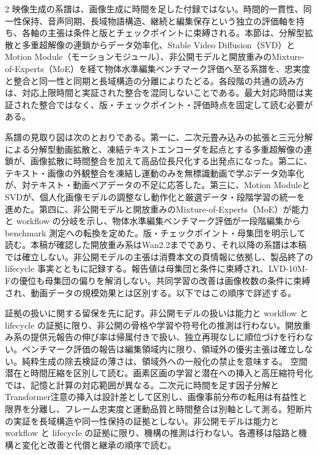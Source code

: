 \documentclass[lualatex,a4paper,10pt]{jlreq}
\begin{document}
\begin{multicols}{2}
\raggedcolumns
映像生成の系譜は、画像生成に時間を足した付録ではない。時間的一貫性、同一性保持、音声同期、長域物語構造、継続と編集保存という独立の評価軸を持ち、各軸の主張は条件と版とチェックポイントに束縛される\autocite{btd070,btd071}。本節は、分解型拡散と多重超解像の連鎖からデータ効率化、Stable Video Diffusion（SVD）とMotion Module（モーションモジュール）、非公開モデルと開放重みのMixture-of-Experts（MoE）を経て物体水準編集ベンチマーク評価へ至る系譜を、忠実度と整合と同一性と同期と長域構造の分離によりたどる\autocite{btd070,btd071,btd073}。各段階の共通の読み方は、対応上限時間と実証された整合を混同しないことである。最大対応時間は実証された整合ではなく、版・チェックポイント・評価時点を固定して読む必要がある\autocite{btd070,btd071,btd073,btd074,btd075,btd077,btd124}。

系譜の見取り図は次のとおりである。第一に、二次元畳み込みの拡張と三元分解による分解型動画拡散と、凍結テキストエンコーダを起点とする多重超解像の連鎖が、画像拡散に時間整合を加えて高品位長尺化する出発点になった\autocite{btd070,btd071}。第二に、テキスト・画像の外観整合を凍結し運動のみを無標識動画で学ぶデータ効率化が、対テキスト・動画ペアデータの不足に応答した\autocite{btd073}。第三に、Motion ModuleとSVDが、個人化画像モデルの調整なし動作化と厳選データ・段階学習の統一を進めた\autocite{btd075,btd074}。第四に、非公開モデルと開放重みのMixture-of-Experts（MoE）が能力と workflow の分岐を示し、物体水準編集ベンチマーク評価が一段階編集から benchmark 測定への転換を定めた\autocite{btd077,btd124,btd138}。版・チェックポイント・母集団を明示して読む。本稿が確認した開放重み系はWan2.2までであり、それ以降の系譜は本稿では確立しない\autocite{btd124}。非公開モデルの主張は消費本文の頁情報に依拠し、製品終了の lifecycle 事実とともに記録する\autocite{btd077}。報告値は母集団と条件に束縛され、LVD-10M-Fの優位も母集団の偏りを解消しない\autocite{btd075}。共同学習の改善は画像枚数の条件に束縛され、動画データの規模効果とは区別する\autocite{btd070}。以下ではこの順序で詳述する。

証拠の扱いに関する留保を先に記す。非公開モデルの扱いは能力と workflow と lifecycle の証拠に限り、非公開の骨格や学習や符号化の推測は行わない\autocite{btd077}。開放重み系の提供元報告の伸び率は帰属付きで扱い、独立再現なしに順位づけを行わない\autocite{btd124}。ベンチマーク評価の報告は編集領域内に限り、領域外の優劣主張は確立しない\autocite{btd138}。純粋生成の除去検証の薄さは、領域外への一般化の禁止を意味する\autocite{btd138}。
空間潜在と時間圧縮を区別して読む。画素区画の学習と潜在への挿入と高圧縮符号化では、記憶と計算の対応範囲が異なる\autocite{btd070,btd071,btd075,btd124}。二次元に時間を足す因子分解とTransformer注意の挿入は設計差として区別し、画像事前分布の転用は有益性と限界を分離し、フレーム忠実度と運動品質と時間整合は別軸として測る\autocite{btd070,btd071,btd073,btd074,btd075,btd138}。短断片の実証を長域構造や同一性保持の証拠としない\autocite{btd070,btd071,btd073,btd074,btd075}。非公開モデルは能力と workflow と lifecycle の証拠に限り、機構の推測は行わない\autocite{btd077}。各遷移は隘路と機構と変化と改善と代償と継承の順序で読む\autocite{btd070,btd071,btd073,btd074,btd075,btd077,btd124,btd138}。

\end{multicols}
\end{document}
